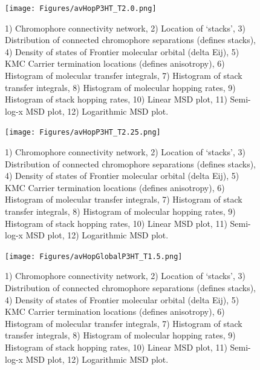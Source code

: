 \documentclass[12pt]{article}
\begin{document}
\begin{figure}[h]\centering
	\texttt{[image: Figures/avHopP3HT\_T2.0.png]}
    \caption{   1) Chromophore connectivity network, 
                2) Location of `stacks', 
                3) Distribution of connected chromophore separations (defines stacks),
                4) Density of states of Frontier molecular orbital (delta Eij),
                5) KMC Carrier termination locations (defines anisotropy),
                6) Histogram of molecular transfer integrals,
                7) Histogram of stack transfer integrals,
                8) Histogram of molecular hopping rates,
                9) Histogram of stack hopping rates,
                10) Linear MSD plot,
                11) Semi-log-x MSD plot,
                12) Logarithmic MSD plot.}
	\label{fig:avHopT2.0}
\end{figure}


\begin{figure}[h]\centering
	\texttt{[image: Figures/avHopP3HT\_T2.25.png]}
    \caption{   1) Chromophore connectivity network, 
                2) Location of `stacks', 
                3) Distribution of connected chromophore separations (defines stacks),
                4) Density of states of Frontier molecular orbital (delta Eij),
                5) KMC Carrier termination locations (defines anisotropy),
                6) Histogram of molecular transfer integrals,
                7) Histogram of stack transfer integrals,
                8) Histogram of molecular hopping rates,
                9) Histogram of stack hopping rates,
                10) Linear MSD plot,
                11) Semi-log-x MSD plot,
                12) Logarithmic MSD plot.}
	\label{fig:avHopT2.25}
\end{figure}


\begin{figure}[h]\centering
	\texttt{[image: Figures/avHopGlobalP3HT\_T1.5.png]}
    \caption{   1) Chromophore connectivity network, 
                2) Location of `stacks', 
                3) Distribution of connected chromophore separations (defines stacks),
                4) Density of states of Frontier molecular orbital (delta Eij),
                5) KMC Carrier termination locations (defines anisotropy),
                6) Histogram of molecular transfer integrals,
                7) Histogram of stack transfer integrals,
                8) Histogram of molecular hopping rates,
                9) Histogram of stack hopping rates,
                10) Linear MSD plot,
                11) Semi-log-x MSD plot,
                12) Logarithmic MSD plot.}
	\label{fig:avHopGlobalT1.5}
\end{figure}
\end{document}
